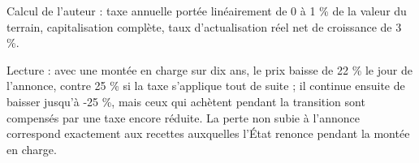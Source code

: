 Calcul de l'auteur : taxe annuelle portée linéairement de 0 à 1 \% de la valeur du terrain, capitalisation complète, taux d'actualisation réel net de croissance de 3 \%.\par Lecture : avec une montée en charge sur dix ans, le prix baisse de 22 \% le jour de l'annonce, contre 25 \% si la taxe s'applique tout de suite ; il continue ensuite de baisser jusqu'à -25 \%, mais ceux qui achètent pendant la transition sont compensés par une taxe encore réduite. La perte non subie à l'annonce correspond exactement aux recettes auxquelles l'État renonce pendant la montée en charge.
